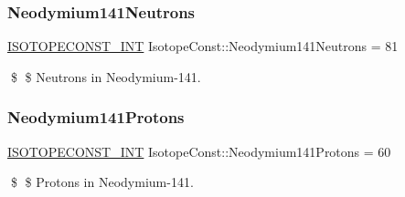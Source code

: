\subsubsection{\texorpdfstring{Neodymium141\+Neutrons}{Neodymium141Neutrons}}
{\footnotesize\ttfamily \mbox{\hyperlink{group___isotope_const-_macros_ga5f18360b3e99483a35c32d789e62621c}{I\+S\+O\+T\+O\+P\+E\+C\+O\+N\+S\+T\+\_\+\+I\+NT}} Isotope\+Const\+::\+Neodymium141\+Neutrons = 81}

\$ \$ Neutrons in Neodymium-\/141. \mbox{\label{group___isotope_const-_neodymium-_nd141_ga33383dbf4531522916e33be9e6ab5a2a}} 
\subsubsection{\texorpdfstring{Neodymium141\+Protons}{Neodymium141Protons}}
{\footnotesize\ttfamily \mbox{\hyperlink{group___isotope_const-_macros_ga5f18360b3e99483a35c32d789e62621c}{I\+S\+O\+T\+O\+P\+E\+C\+O\+N\+S\+T\+\_\+\+I\+NT}} Isotope\+Const\+::\+Neodymium141\+Protons = 60}

\$ \$ Protons in Neodymium-\/141. 